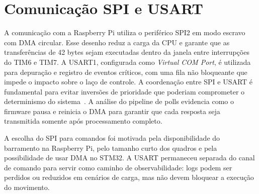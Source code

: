 \section{Comunicação SPI e USART}
\label{sec:spi_usart}

A comunicação com a Raspberry Pi utiliza o periférico SPI2 em modo
escravo com DMA circular. Esse desenho reduz a carga da CPU e garante que
as transferências de 42 bytes sejam executadas dentro da janela entre
interrupções do TIM6 e TIM7. A USART1, configurada como \emph{Virtual
COM Port}, é utilizada para depuração e registro de eventos críticos,
com uma fila não bloqueante que impede o impacto sobre o laço de
controle. A coordenação entre SPI e USART é fundamental para evitar
inversões de prioridade que poderiam comprometer o determinismo do
sistema~\cite{um2153}. A análise do pipeline de polls evidencia como o
firmware pausa e reinicia o DMA para garantir que cada resposta seja
transmitida somente após processamento completo.

A escolha do SPI para comandos foi motivada pela disponibilidade do
barramento na Raspberry Pi, pelo tamanho curto dos quadros e pela
possibilidade de usar DMA no STM32. A USART permaneceu separada do canal
de comando para servir como caminho de observabilidade: logs podem ser
perdidos ou reduzidos em cenários de carga, mas não devem bloquear a
execução do movimento.
